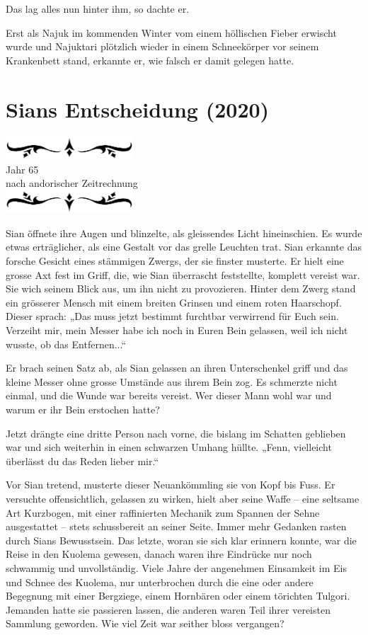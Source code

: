 \documentclass[10pt, a4paper, oneside]{book}
\newcommand{\az}[1]{%
    \begin{center}
        \includegraphics[width=180px]{Das Erbe des Wunderkindes/verzierung1.png}\\
        {\Huge #1} \\
        {nach andorischer Zeitrechnung}\\
        \includegraphics[width=180px]{Das Erbe des Wunderkindes/verzierung2.png}
    \end{center}
    \extramarks{}{#1 a.Z.}
}
\begin{document}
Das lag alles nun hinter ihm, so dachte er.

Erst als Najuk im kommenden Winter vom einem höllischen Fieber erwischt wurde und Najuktari plötzlich wieder in einem Schneekörper vor seinem Krankenbett stand, erkannte er, wie falsch er damit gelegen hatte.







\newpage
\section{Sians Entscheidung (2020)}

\az{Jahr 65}

Sian öffnete ihre Augen und blinzelte, als gleissendes Licht hineinschien. Es wurde etwas erträglicher, als eine Gestalt vor das grelle Leuchten trat. Sian erkannte das forsche Gesicht eines stämmigen Zwergs, der sie finster musterte. Er hielt eine grosse Axt fest im Griff, die, wie Sian überrascht feststellte, komplett vereist war. Sie wich seinem Blick aus, um ihn nicht zu provozieren. Hinter dem Zwerg stand ein grösserer Mensch mit einem breiten Grinsen und einem roten Haarschopf. Dieser sprach: „Das muss jetzt bestimmt furchtbar verwirrend für Euch sein. Verzeiht mir, mein Messer habe ich noch in Euren Bein gelassen, weil ich nicht wusste, ob das Entfernen...“

Er brach seinen Satz ab, als Sian gelassen an ihren Unterschenkel griff und das kleine Messer ohne grosse Umstände aus ihrem Bein zog. Es schmerzte nicht einmal, und die Wunde war bereits vereist. Wer dieser Mann wohl war und warum er ihr Bein erstochen hatte?

Jetzt drängte eine dritte Person nach vorne, die bislang im Schatten geblieben war und sich weiterhin in einen schwarzen Umhang hüllte. „Fenn, vielleicht überlässt du das Reden lieber mir.“

Vor Sian tretend, musterte dieser Neuankömmling sie von Kopf bis Fuss. Er versuchte offensichtlich, gelassen zu wirken, hielt aber seine Waffe – eine seltsame Art Kurzbogen, mit einer raffinierten Mechanik zum Spannen der Sehne ausgestattet – stets schussbereit an seiner Seite. Immer mehr Gedanken rasten durch Sians Bewusstsein. Das letzte, woran sie sich klar erinnern konnte, war die Reise in den Kuolema gewesen, danach waren ihre Eindrücke nur noch schwammig und unvollständig. Viele Jahre der angenehmen Einsamkeit im Eis und Schnee des Kuolema, nur unterbrochen durch die eine oder andere Begegnung mit einer Bergziege, einem Hornbären oder einem törichten Tulgori. Jemanden hatte sie passieren lassen, die anderen waren Teil ihrer vereisten Sammlung geworden. Wie viel Zeit war seither bloss vergangen?
\end{document}
